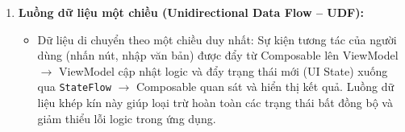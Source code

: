 \begin{enumerate}
    \item \textbf{Luồng dữ liệu một chiều (Unidirectional Data Flow -- UDF):}
    \begin{itemize}
        \item Dữ liệu di chuyển theo một chiều duy nhất: Sự kiện tương tác của người dùng (nhấn nút, nhập văn bản) được đẩy từ Composable lên ViewModel $\rightarrow$ ViewModel cập nhật logic và đẩy trạng thái mới (UI State) xuống qua \texttt{StateFlow} $\rightarrow$ Composable quan sát và hiển thị kết quả. Luồng dữ liệu khép kín này giúp loại trừ hoàn toàn các trạng thái bất đồng bộ và giảm thiểu lỗi logic trong ứng dụng.
    \end{itemize}
\end{enumerate}
